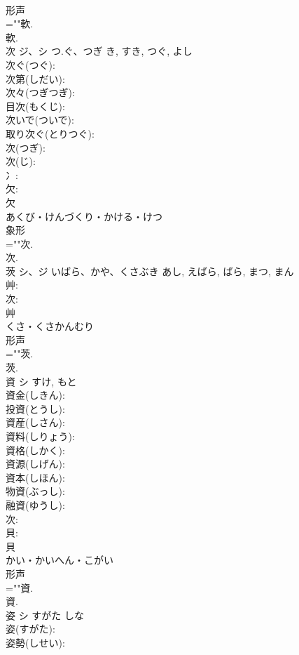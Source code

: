 \documentclass[8pt]{extreport}
\begin{document}
\begin{CJK}{UTF8}{min}
\\	形声 
\\	=""軟.
\\	軟.
\\	次	ジ、シ	つ.ぐ、つぎ	き, すき, つぐ, よし	
\\	次ぐ(つぐ): 
\\	次第(しだい): 
\\	次々(つぎつぎ): 
\\	目次(もくじ): 
\\	次いで(ついで): 
\\	取り次ぐ(とりつぐ): 
\\	次(つぎ): 
\\	次(じ): 
\\	冫: 
\\	欠: 
\\	欠	
\\	あくび・けんづくり・かける・けつ	
\\	象形 
\\	=""次.
\\	次.
\\	茨	シ、ジ	いばら、かや、くさぶき	あし, えばら, ばら, まつ, まん	
\\	艸: 
\\	次: 
\\	艸	
\\	くさ・くさかんむり	
\\	形声 
\\	=""茨.
\\	茨.
\\	資	シ		すけ, もと	
\\	資金(しきん): 
\\	投資(とうし): 
\\	資産(しさん): 
\\	資料(しりょう): 
\\	資格(しかく): 
\\	資源(しげん): 
\\	資本(しほん): 
\\	物資(ぶっし): 
\\	融資(ゆうし): 
\\	次: 
\\	貝: 
\\	貝	
\\	かい・かいへん・こがい	
\\	形声 
\\	=""資.
\\	資.
\\	姿	シ	すがた	しな	
\\	姿(すがた): 
\\	姿勢(しせい): 

\end{CJK}
\end{document}

